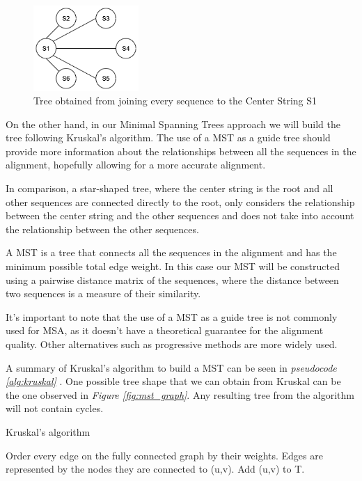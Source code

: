 \documentclass[twoside,openright,titlepage,numbers=noenddot,headinclude,%
                footinclude=true,cleardoublepage=empty,abstractoff, %
                BCOR=5mm,paper=a4,fontsize=11pt,%
                ngerman,american,%
                ]{scrreprt}
\begin{document}
\begin{figure}[h]
\includegraphics[width=4cm]{report/gusfields.png}
\centering
\caption{Tree obtained from joining every sequence to the Center String S1}
\label{fig:center_string}
\end{figure}

On the other hand, in our Minimal Spanning Trees approach we will build the tree following Kruskal's algorithm. The use of a MST as a guide tree should provide more information about the relationships between all the sequences in the alignment, hopefully allowing for a more accurate alignment. 

In comparison, a star-shaped tree, where the center string is the root and all other sequences are connected directly to the root, only considers the relationship between the center string and the other sequences and does not take into account the relationship between the other sequences. 

A MST is a tree that connects all the sequences in the alignment and has the minimum possible total edge weight. In this case our MST will be constructed using a pairwise distance matrix of the sequences, where the distance between two sequences is a measure of their similarity.

It's important to note that the use of a MST as a guide tree is not commonly used for MSA, as it doesn't have a theoretical guarantee for the alignment quality. Other alternatives such as progressive methods are more widely used.

A summary of Kruskal's algorithm to build a MST can be seen in \textit{pseudocode \ref{alg:kruskal}} \cite{cormen2022introduction}. One possible tree shape that we can obtain from Kruskal can be the one observed in \textit{Figure \ref{fig:mst_graph}}. Any resulting tree from the algorithm will not contain cycles.

\begin{algorithm}
	\caption{Kruskal's algorithm} 
    \label{alg:kruskal}
	\begin{algorithmic}[1]
        \State Order every edge on the fully connected graph by their weights.
        \State Edges are represented by the nodes they are connected to (u,v).
		          \State Add (u,v) to T.
		      \EndIf
		\EndFor
	\end{algorithmic} 
\end{algorithm}
\end{document}
